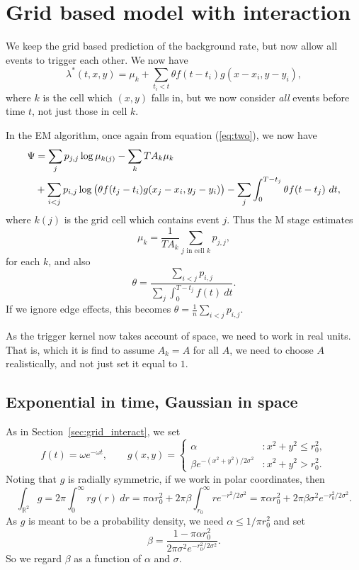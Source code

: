 \documentclass[twoside,a4paper]{article}
\theoremstyle{plain}
\theoremstyle{definition}
\begin{document}
\section{Grid based model with interaction}\label{app:grid_interact}

We keep the grid based prediction of the background rate, but now allow all events to
trigger each other.  We now have
\[ \lambda^*(t,x,y) = \mu_k + \sum_{t_i<t} \theta f(t-t_i) g(x-x_i, y-y_i), \]
where $k$ is the cell which $(x,y)$ falls in, but we now consider \emph{all} events before
time $t$, not just those in cell $k$.

In the EM algorithm, once again from equation (\ref{eq:two}), we now have
\begin{align}
\Psi &= \sum_j p_{j,j} \log \mu_{k(j)} - \sum_k T A_k \mu_k \notag \\
&+ \sum_{i<j} p_{i,j} \log\big(\theta f(t_j-t_i) g(x_j-x_i, y_j-y_i)\big)
- \sum_j \int_0^{T-t_j} \theta f(t-t_j) \ dt,
\label{eq:gen_one}
\end{align}
where $k(j)$ is the grid cell which contains event $j$.  Thus the M stage estimates
\[ \mu_k = \frac{1}{TA_k} \sum_{j\text{ in cell }k} p_{j,j}, \]
for each $k$, and also
\[ \theta = \frac{\sum_{i<j} p_{i,j}}{\sum_j \int_0^{T-t_j} f(t) \ dt}. \]
If we ignore edge effects, this becomes $\theta = \frac{1}{n} \sum_{i<j} p_{i,j}$.

As the trigger kernel now takes account of space, we need to work in real units.  That is,
which it is find to assume $A_k=A$ for all $A$, we need to choose $A$ realistically, and
not just set it equal to $1$.


\subsection{Exponential in time, Gaussian in space}

As in Section~\ref{sec:grid_interact}, we set
\[ f(t) = \omega e^{-\omega t}, \qquad
g(x,y) = \begin{cases} \alpha &: x^2+y^2\leq r_0^2, \\
\beta e^{-(x^2+y^2)/2\sigma^2} &: x^2+y^2 > r_0^2. \end{cases} \]
Noting that $g$ is radially symmetric, if we work in polar coordinates, then
\[ \int_{\mathbb R^2} g = 2\pi\int_0^\infty r g(r) \ dr
= \pi\alpha r_0^2 + 2\pi\beta\int_{r_0}^\infty r e^{-r^2/2\sigma^2}
= \pi\alpha r_0^2 + 2\pi\beta\sigma^2 e^{-r_0^2/2\sigma^2}. \]
As $g$ is meant to be a probability density, we need $\alpha \leq 1/ \pi r_0^2$ and
set
\[ \beta = \frac{1 - \pi\alpha r_0^2}{2\pi\sigma^2 e^{-r_0^2/2\sigma^2}}. \]
So we regard $\beta$ as a function of $\alpha$ and $\sigma$.
\end{document}
